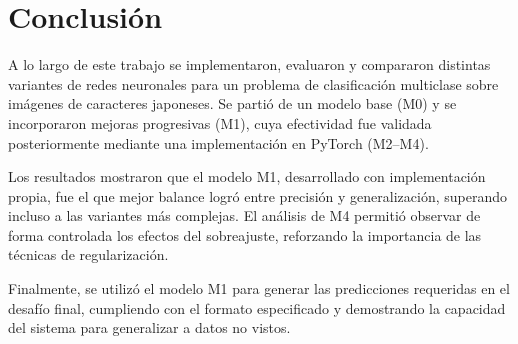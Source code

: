 \documentclass[11pt]{article}
\begin{document}
\section{Conclusión}

A lo largo de este trabajo se implementaron, evaluaron y compararon distintas variantes de redes neuronales para un problema de clasificación multiclase sobre imágenes de caracteres japoneses. Se partió de un modelo base (M0) y se incorporaron mejoras progresivas (M1), cuya efectividad fue validada posteriormente mediante una implementación en PyTorch (M2–M4).

Los resultados mostraron que el modelo M1, desarrollado con implementación propia, fue el que mejor balance logró entre precisión y generalización, superando incluso a las variantes más complejas. El análisis de M4 permitió observar de forma controlada los efectos del sobreajuste, reforzando la importancia de las técnicas de regularización.

Finalmente, se utilizó el modelo M1 para generar las predicciones requeridas en el desafío final, cumpliendo con el formato especificado y demostrando la capacidad del sistema para generalizar a datos no vistos.
\end{document}

